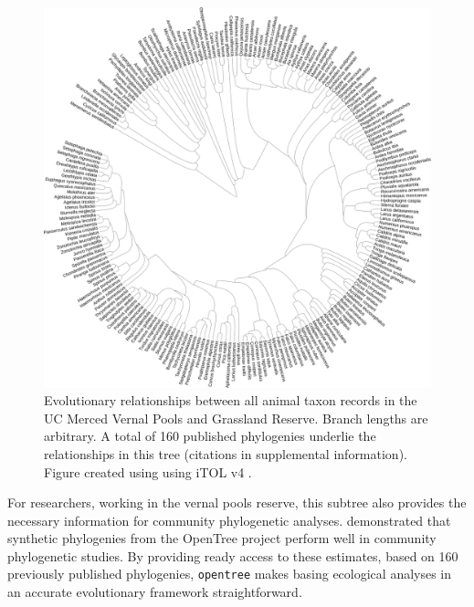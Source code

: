 \documentclass[oupdraft]{sysbio_sse}
\begin{document}
\begin{figure}[!h]
\centering\includegraphics[width=\textwidth]{vernal_animals}
\caption{Evolutionary relationships between all animal taxon records in the UC Merced Vernal Pools and Grassland Reserve. Branch lengths are arbitrary. A total of 160 published phylogenies underlie the relationships in this tree (citations in supplemental information). Figure created using using iTOL v4 \citep{letunic_interactive_2019}.}
\label{vernalanimals}
\end{figure}



For researchers, working in the vernal pools reserve, this subtree also provides the necessary information for community phylogenetic analyses. \citet{li_for_2019} demonstrated that synthetic phylogenies from the OpenTree project perform well in community phylogenetic studies. By providing ready access to these estimates, based on 160 previously published phylogenies, \texttt{opentree} makes basing ecological analyses in an accurate evolutionary framework straightforward.
\end{document}
